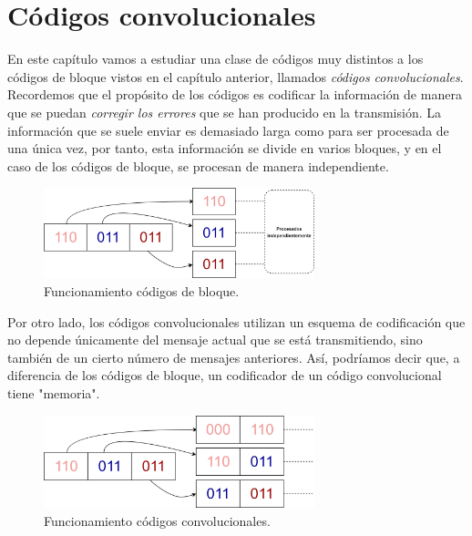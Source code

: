 

\chapter{Códigos convolucionales}\label{ch:cuarto-capitulo}

En este capítulo vamos a estudiar una clase de códigos muy distintos a los códigos de bloque vistos en el capítulo anterior, llamados \emph{códigos convolucionales}. Recordemos que el propósito de los códigos es codificar la información de manera que se puedan \emph{corregir los errores} que se han producido en la transmisión. La información que se suele enviar es demasiado larga como para ser procesada de una única vez, por tanto, esta información se divide en varios bloques, y en el caso de los códigos de bloque, se procesan de manera independiente.

\begin{figure}[h]
    \centering
    \includegraphics[width=0.7\textwidth]{img/codbloque.png}
    \caption{Funcionamiento códigos de bloque.}
    \label{fig:codbloque}
\end{figure}

Por otro lado, los códigos convolucionales utilizan un esquema de codificación que no depende únicamente del mensaje actual que se está transmitiendo, sino también de un cierto número de mensajes anteriores. Así, podríamos decir que, a diferencia de los códigos de bloque, un codificador de un código convolucional tiene "memoria".

\begin{figure}[h]
    \centering
    \includegraphics[width=0.7\textwidth]{img/codconvolucionales.png}
    \caption{Funcionamiento códigos convolucionales.}
    \label{fig:codconvolucional}
\end{figure}

